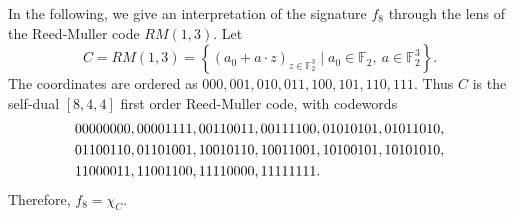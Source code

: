 In the following, we give an interpretation of the signature $f_8$ through the lens of the Reed-Muller code $RM(1,3).$
Let
\begin{equation}
 C=RM(1,3)
 =\left\{(a_0+a\cdot z)_{z\in\mathbb F_2^3}\mid 
 a_0\in\mathbb F_2,\ a\in\mathbb F_2^3\right\}.
 \label{eq: RM code definition}
\end{equation}
The coordinates are ordered as
$000,001,010,011,100,101,110,111$.  Thus $C$ is the self-dual
$[8,4,4]$ first order Reed-Muller code, with codewords
\begin{align*}
&00000000,00001111,00110011,00111100,01010101,01011010,\notag\\
&01100110,01101001,10010110,10011001,10100101,10101010,\notag\\
&11000011,11001100,11110000,11111111.
\end{align*}
Therefore, $f_8=\chi_C.$

